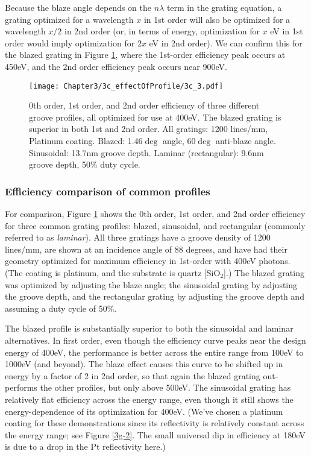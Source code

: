 Because the blaze angle depends on the $n \lambda$ term in the grating equation, a grating optimized for a wavelength $x$ in 1st order will also be optimized for a wavelength $x/2$ in 2nd order (or, in terms of energy, optimization for $x$ eV in 1st order would imply optimization for $2x$ eV in 2nd order).  We can confirm this for the blazed grating in Figure \ref{3c-plot}, where the 1st-order efficiency peak occurs at 450eV, and the 2nd order efficiency peak occurs near 900eV.

\begin{figure}[htbp] %
   \centering
   \texttt{[image: Chapter3/3c\_effectOfProfile/3c\_3.pdf]} 
   \caption{0th order, 1st order, and 2nd order efficiency of three different groove profiles, all optimized for use at 400eV.  The blazed grating is superior in both 1st and 2nd order.  All gratings: 1200 lines/mm, Platinum coating.  Blazed: 1.46$\deg$ angle, 60$\deg$ anti-blaze angle.  Sinusoidal: 13.7nm groove depth.  Laminar (rectangular): 9.6nm groove depth, 50\% duty cycle. }
   \label{3c-plot}
\end{figure}

\subsubsection{Efficiency comparison of common profiles}
For comparison, Figure \ref{3c-plot} shows the 0th order, 1st order, and 2nd order efficiency for three common grating profiles: blazed, sinusoidal, and rectangular (commonly referred to as \emph{laminar}).  All three gratings have a groove density of 1200 lines/mm, are shown at an incidence angle of 88 degrees, and have had their geometry optimized for maximum efficiency in 1st-order with 400eV photons.  (The coating is platinum, and the substrate is quartz [SiO$_2$].)  The blazed grating was optimized by adjusting the blaze angle; the sinusoidal grating by adjusting the groove depth, and the rectangular grating by adjusting the groove depth and assuming a duty cycle of 50\%.

The blazed profile is substantially superior to both the sinusoidal and laminar alternatives.  In first order, even though the efficiency curve peaks near the design energy of 400eV, the performance is better across the entire range from 100eV to 1000eV (and beyond).  The blaze effect causes this curve to be shifted up in energy by a factor of 2 in 2nd order, so that again the blazed grating out-performs the other profiles, but only above 500eV.  The sinusoidal grating has relatively flat efficiency across the energy range, even though it still shows the energy-dependence of its optimization for 400eV.   (We've chosen a platinum coating for these demonstrations since its reflectivity is relatively constant across the energy range; see Figure \ref{3g-2}.  The small universal dip in efficiency at 180eV is due to a drop in the Pt reflectivity here.)

